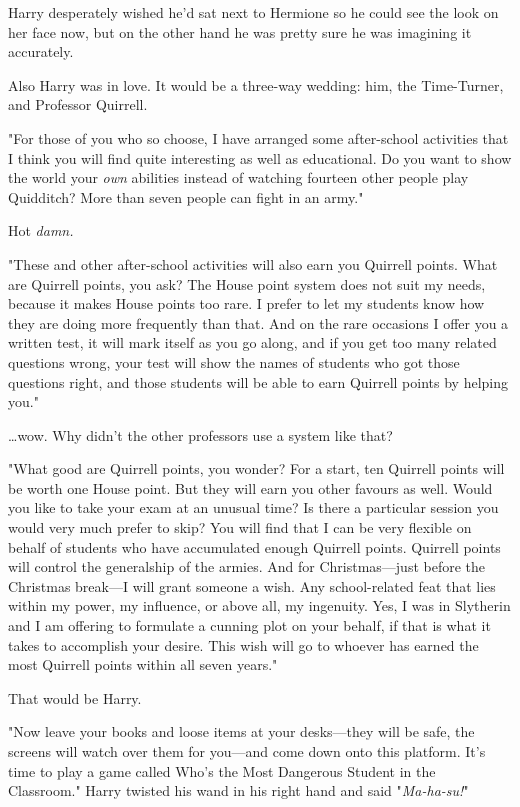 Harry desperately wished he’d sat next to Hermione so he could see the look on
her face now, but on the other hand he was pretty sure he was imagining it
accurately.

Also Harry was in love. It would be a three-way wedding: him, the Time-Turner,
and Professor Quirrell.

"For those of you who so choose, I have arranged some after-school activities
that I think you will find quite interesting as well as educational. Do you
want to show the world your \emph{own} abilities instead of watching fourteen
other people play Quidditch? More than seven people can fight in an army."

Hot \emph{damn.}

"These and other after-school activities will also earn you Quirrell points.
What are Quirrell points, you ask? The House point system does not suit my
needs, because it makes House points too rare. I prefer to let my students know
how they are doing more frequently than that. And on the rare occasions I offer
you a written test, it will mark itself as you go along, and if you get too
many related questions wrong, your test will show the names of students who got
those questions right, and those students will be able to earn Quirrell points
by helping you."

…wow. Why didn’t the other professors use a system like that?

"What good are Quirrell points, you wonder? For a start, ten Quirrell points
will be worth one House point. But they will earn you other favours as well.
Would you like to take your exam at an unusual time? Is there a particular
session you would very much prefer to skip? You will find that I can be very
flexible on behalf of students who have accumulated enough Quirrell points.
Quirrell points will control the generalship of the armies. And for
Christmas—just before the Christmas break—I will grant someone a wish. Any
school-related feat that lies within my power, my influence, or above all, my
ingenuity. Yes, I was in Slytherin and I am offering to formulate a cunning
plot on your behalf, if that is what it takes to accomplish your desire. This
wish will go to whoever has earned the most Quirrell points within all seven
years."

That would be Harry.

"Now leave your books and loose items at your desks—they will be safe, the
screens will watch over them for you—and come down onto this platform. It’s
time to play a game called Who’s the Most Dangerous Student in the Classroom."
\later
Harry twisted his wand in his right hand and said "\emph{Ma-ha-su!}"

